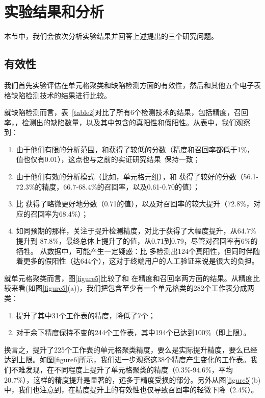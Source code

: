 \section{实验结果和分析}

本节中，我们会依次分析实验结果并回答上述提出的三个研究问题。

\subsection{有效性}

我们首先实验评估\wa 在单元格聚类和缺陷检测方面的有效性，然后和其他五个电子表格缺陷检测技术的结果进行比较。



就缺陷检测而言，表~\ref{table2}对比了所有6个检测技术的结果，包括精度，召回率，\fmd，检测出的缺陷数量，以及其中包含的真阳性和假阳性。从表中，我们观察到：

\begin{enumerate}
    \item 由于他们有限的分析范围，\uc 和\di 获得了较低的分数（精度和召回率都低于1\%，\fmd 值也仅有0.01），这点也与之前的实证研究结果~\cite{zhang2017effectively}保持一致；
    \item 由于他们有效的分析模式（比如，单元格元组），\am 和 \ca 获得了较好的分数（56.1-72.3\%的精度，66.7-68.4\%的召回率，以及0.61-0.70的\fmd 值）；
    \item \cu 比 \ca 获得了略微更好地分数（0.71的\fmd 值），以及对召回率的较大提升（72.8\%，对应的\ca 召回率为68.4\%）；
    \item 如同预期的那样，\wa 关注于提升检测精度，对比于\cu 获得了大幅度提升，从64.7\% 提升到 87.8\%，最终总体上提升了\fmd 的值，从0.71到0.79，尽管对召回率有6\%的牺牲。 从数据中，可能产生一定疑惑：\cu 比 \wa 多检测出124个真阳性，但同时伴随着更多的假阳性（达644个），这对于终端用户的人工验证来说是很大的负担。
\end{enumerate}



就单元格聚类而言，图\ref{figure5}比较了\cu 和 \wa 在精度和召回率两方面的结果。从精度比较来看(如图\ref{figure5}(a))，我们把包含至少有一个单元格类的282个工作表分成两类：
\begin{enumerate}
    \item \wa 提升了其中31个工作表的精度，降低了7个；
    \item 对于余下精度保持不变的244个工作表，其中194个已达到100\%（即上限）。
\end{enumerate}
换言之，\wa 提升了225个工作表的单元格聚类精度，要么是实际提升精度，要么已经达到上限。如图\ref{figure6}所示，我们进一步观察这38个精度产生变化的工作表。我们不难发现，\wa 在不同程度上提升了单元格聚类的精度（0.3\%-94.6\%，平均20.7\%），这样的精度提升是显著的，远多于精度受损的部分。另外从图\ref{figure5}(b)中，我们也注意到，\wa 在精度提升上的有效性也仅导致召回率的轻微下降（2.4\%）。

